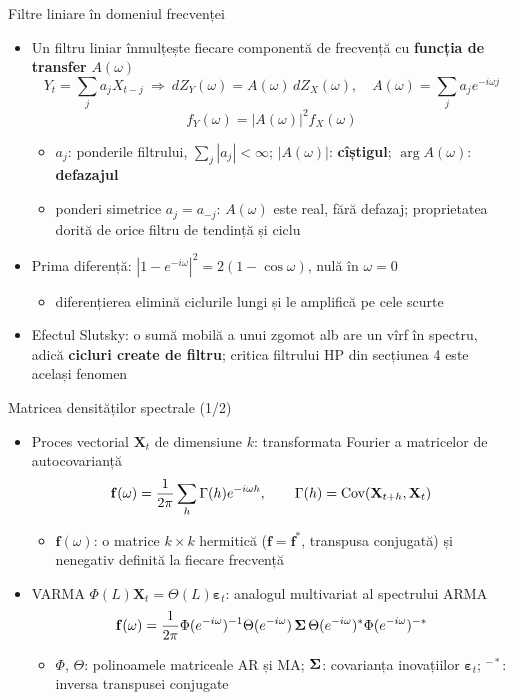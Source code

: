 \begin{frame}{Filtre liniare în domeniul frecvenței}
\itemsize{\small}
\begin{itemize}
    \item Un filtru liniar înmulțește fiecare componentă de frecvență cu \textbf{funcția de transfer} $A(\omega)$
    \[ Y_t = \sum_j a_jX_{t-j} \ \Rightarrow\ dZ_Y(\omega) = A(\omega)\,dZ_X(\omega), \quad A(\omega) = \sum_j a_je^{-i\omega j} \]
    \[ f_Y(\omega) = |A(\omega)|^2f_X(\omega) \]
    \begin{itemize}
        \item $a_j$: ponderile filtrului, $\sum_j|a_j| < \infty$; $|A(\omega)|$: \textbf{cîștigul}; $\arg A(\omega)$: \textbf{defazajul}
        \item ponderi simetrice $a_j = a_{-j}$: $A(\omega)$ este real, fără defazaj; proprietatea dorită de orice filtru de tendință și ciclu
    \end{itemize}
    \item Prima diferență: $|1 - e^{-i\omega}|^2 = 2(1 - \cos\omega)$, nulă în $\omega = 0$
    \begin{itemize}
        \item diferențierea elimină ciclurile lungi și le amplifică pe cele scurte
    \end{itemize}
    \item Efectul Slutsky: o sumă mobilă a unui zgomot alb are un vîrf în spectru, adică \textbf{cicluri create de filtru}; critica filtrului HP din secțiunea 4 este același fenomen
\end{itemize}
\end{frame}

\begin{frame}{Matricea densităților spectrale (1/2)}
\itemsize{\small}
\begin{itemize}
    \item Proces vectorial $\mathbf X_t$ de dimensiune $k$: transformata Fourier a matricelor de autocovarianță
    \[ \mathbf f(\omega) = \frac{1}{2\pi}\sum_h\Gamma(h)e^{-i\omega h}, \qquad \Gamma(h) = \text{Cov}(\mathbf X_{t+h}, \mathbf X_t) \]
    \begin{itemize}
        \item $\mathbf f(\omega)$: o matrice $k \times k$ hermitică ($\mathbf f = \mathbf f^*$, transpusa conjugată) și nenegativ definită la fiecare frecvență
    \end{itemize}
    \item VARMA $\Phi(L)\mathbf X_t = \Theta(L)\boldsymbol\varepsilon_t$: analogul multivariat al spectrului ARMA
    \[ \mathbf f(\omega) = \frac{1}{2\pi}\Phi(e^{-i\omega})^{-1}\Theta(e^{-i\omega})\,\boldsymbol{\Sigma}\,\Theta(e^{-i\omega})^*\Phi(e^{-i\omega})^{-*} \]
    \begin{itemize}
        \item $\Phi$, $\Theta$: polinoamele matriceale AR și MA; $\boldsymbol{\Sigma}$: covarianța inovațiilor $\boldsymbol\varepsilon_t$; $^{-*}$: inversa transpusei conjugate
    \end{itemize}
\end{itemize}
\end{frame}

